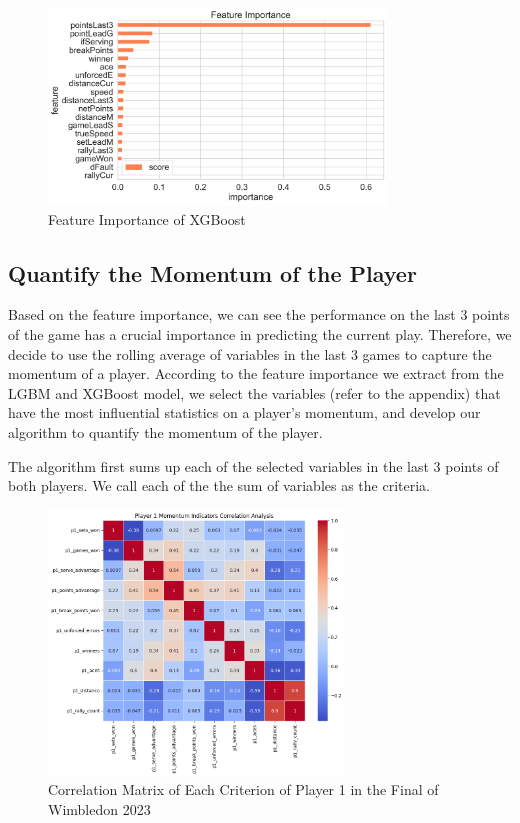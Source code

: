 \documentclass[12pt]{article}
\begin{document}
\begin{figure}[h!]
    \centering
    \includegraphics[width=0.8\textwidth]{feature_XGB.png}
    \caption{Feature Importance of XGBoost}
    \label{fig:4}
\end{figure}

\pagebreak
\subsection{Quantify the Momentum of the Player}
\quad Based on the feature importance, we can see the performance on the last 3 points of the game has a crucial importance in predicting the current play. Therefore, we decide to use the rolling average of variables in the last 3 games to capture the momentum of a player.
According to the feature importance we extract from the LGBM and XGBoost model, we select the variables (refer to the appendix) that have the most influential statistics on a player's momentum, and develop our algorithm
to quantify the momentum of the player. 

The algorithm first sums up each of the selected variables in the last 3 points of both players. We call each of the
the sum of variables as the criteria.

\begin{figure}[h!]
    \centering
    \includegraphics[width=0.7\textwidth]{correlation.png}
    \caption{Correlation Matrix of Each Criterion of Player 1 in the Final of Wimbledon 2023} 
    \label{fig:5}
\end{figure}
\end{document}
